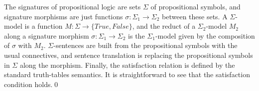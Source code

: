 \documentclass[10pt,fleqn,final]{scrreprt}
\providecommand{\DIFaddbegin}{} %
\providecommand{\DIFaddend}{} %
\begin{document}
\begin{definition}\label{Prop}
The signatures of propositional logic are sets $\Sigma$ of propositional symbols, and signature morphisms are just
functions $\sigma:{\Sigma_1}\to{\Sigma_2}$ between these sets. 
A $\Sigma$-model is a function $M : {\Sigma}\to{\{True, False\}}$, and the reduct of a 
$\Sigma_2$-model $M_2$ along a signature morphism $\sigma:{\Sigma_1}\to{\Sigma_2}$ is 
the $\Sigma_1$-model given by the composition of $\sigma$ with $M_2$. $\Sigma$-sentences are built from the
propositional symbols with the usual connectives, and sentence translation is replacing the propositional
symbols in $\Sigma$ along the morphism. Finally, the satisfaction relation is defined by the standard truth-tables
semantics. It is straightforward to see that the satisfaction condition holds.\DIFaddbegin \quad\DIFaddend \qed
\end{definition}
\end{document}
